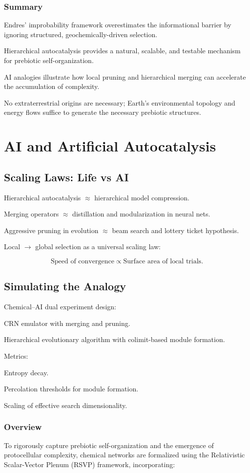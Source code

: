 \documentclass{book}
\begin{document}
\section{Summary}
Endres’ improbability framework overestimates the informational barrier by ignoring structured, geochemically-driven selection.

Hierarchical autocatalysis provides a natural, scalable, and testable mechanism for prebiotic self-organization.

AI analogies illustrate how local pruning and hierarchical merging can accelerate the accumulation of complexity.

No extraterrestrial origins are necessary; Earth’s environmental topology and energy flows suffice to generate the necessary prebiotic structures.

\part{AI and Artificial Autocatalysis}

\chapter{Scaling Laws: Life vs AI}
Hierarchical autocatalysis $\approx$ hierarchical model compression.

Merging operators $\approx$ distillation and modularization in neural nets.

Aggressive pruning in evolution $\approx$ beam search and lottery ticket hypothesis.

Local $\to$ global selection as a universal scaling law:

\[\text{Speed of convergence} \propto \text{Surface area of local trials}.\]

\chapter{Simulating the Analogy}
Chemical–AI dual experiment design:

CRN emulator with merging and pruning.

Hierarchical evolutionary algorithm with colimit-based module formation.

Metrics:

Entropy decay.

Percolation thresholds for module formation.

Scaling of effective search dimensionality.

\section{Overview}
To rigorously capture prebiotic self-organization and the emergence of protocellular complexity, chemical networks are formalized using the Relativistic Scalar-Vector Plenum (RSVP) framework, incorporating:
\end{document}
